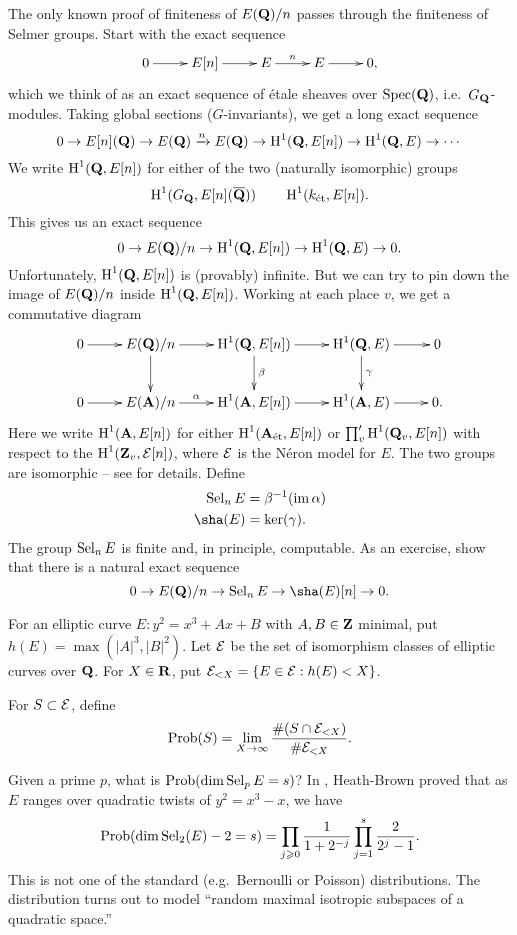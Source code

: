 The only known proof of finiteness of $E(\mathbf{Q})/n$ passes through the finiteness 
of Selmer groups. Start with the exact sequence 
\[\xymatrix{
  0 \ar[r] 
    & E[n] \ar[r] 
    & E \ar[r]^-n 
    & E \ar[r] 
    & 0 ,
}\]
which we think of as an exact sequence of \'etale sheaves over 
$\operatorname{Spec}(\mathbf{Q})$, i.e.~$G_{\mathbf{Q}}$-modules. Taking global sections 
($G$-invariants), we get a long exact sequence 
\[
  0 \to E[n](\mathbf{Q}) \to E(\mathbf{Q}) \xrightarrow n E(\mathbf{Q}) \to \operatorname{H}^1(\mathbf{Q},E[n]) \to \operatorname{H}^1(\mathbf{Q},E) \to \cdots
\]
We write $\operatorname{H}^1(\mathbf{Q},E[n])$ for either of the two (naturally isomorphic) groups 
\[
  \operatorname{H}^1(G_{\mathbf{Q}},E[n](\overline{\mathbf{Q}}))\qquad \operatorname{H}^1(k_\textnormal{\'et},E[n]).
\]
This gives us an exact sequence 
\[
  0 \to E(\mathbf{Q})/n \to \operatorname{H}^1(\mathbf{Q},E[n]) \to \operatorname{H}^1(\mathbf{Q},E) \to 0 .
\]
Unfortunately, $\operatorname{H}^1(\mathbf{Q},E[n])$ is (provably) infinite. But we can try to pin 
down the image of $E(\mathbf{Q})/n$ inside $\operatorname{H}^1(\mathbf{Q},E[n])$. Working at each place 
$v$, we get a commutative diagram 
\[\xymatrix{
  0 \ar[r] 
    & E(\dQ)/n \ar[r] \ar[d] 
    & \h^1(\dQ,E[n]) \ar[r] \ar[d]^-\beta 
    & \h^1(\dQ,E) \ar[r] \ar[d]^-\gamma 
    & 0 \\
  0 \ar[r] 
    & E(\dA)/n \ar[r]^-\alpha 
    & \h^1(\dA,E[n]) \ar[r] 
    & \h^1(\dA,E) \ar[r] 
    & 0 .
}\]
Here we write $\operatorname{H}^1(\mathbf{A},E[n])$ for either $\operatorname{H}^1(\mathbf{A}_\textnormal{\'et},E[n])$ 
or $\prod_v' \operatorname{H}^1(\mathbf{Q}_v,E[n])$ with respect to the $\operatorname{H}^1(\mathbf{Z}_v,\mathcal{E}[n])$, where 
$\mathcal{E}$ is the N\'eron model for $E$. The two groups are isomorphic -- see 
\cite{mathoverflow} for details. 
Define 
\begin{align*}
  \selmer_n E &= \beta^{-1}(\image \alpha) \\
  \sha(E) &= \ker(\gamma) .
\end{align*}
The group $\operatorname{Sel}_n E$ is finite and, in principle, computable. As an 
exercise, show that there is a natural exact sequence 
\[
  0 \to E(\dQ)/n \to \selmer_n E \to \sha(E)[n] \to 0 .
\]

For an elliptic curve $E:y^2=x^3+A x+B$ with $A,B\in \mathbf{Z}$ minimal, put 
$h(E)=\max(|A|^3,|B|^2)$. Let $\mathcal{E}$ be the set of isomorphism classes of 
elliptic curves over $\mathbf{Q}$. For $X\in \mathbf{R}$, put 
$\mathcal{E}_{<X}=\{E\in \mathcal{E}:h(E)<X\}$. 

\begin{defi}
For $S\subset \mathcal{E}$, define 
\[
  \operatorname{Prob}(S) = \lim_{X\to \infty} \frac{\#(S\cap \mathcal{E}_{<X})}{\# \mathcal{E}_{<X}} .
\]
\end{defi}

Given a prime $p$, what is $\operatorname{Prob}(\dim\operatorname{Sel}_p E=s)$? In \cite{h94}, 
Heath-Brown proved that as $E$ ranges over quadratic twists of $y^2=x^3-x$, 
we have 
\[
  \operatorname{Prob}(\dim \operatorname{Sel}_2(E)-2=s) = \prod_{j\geqslant 0} \frac{1}{1+2^{-j}} \prod_{j=1}^s \frac{2}{2^j-1} .
\]
This is not one of the standard (e.g.~Bernoulli or Poisson) distributions. 
The distribution turns out to model ``random maximal isotropic subspaces of a 
quadratic space.'' 





